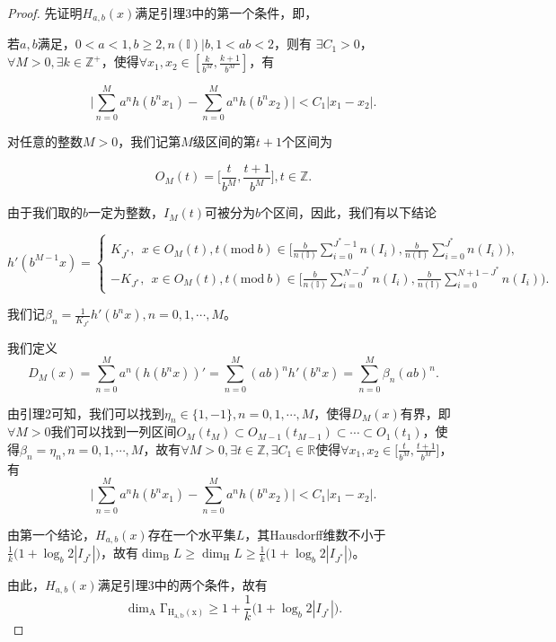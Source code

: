\begin{proof}

    先证明$H_{a,b}(x)$满足引理3中的第一个条件，即，

    若$a,b$满足，$0<a<1,b\ge2,n(\mathbb{I})|b,1<ab<2$，则有 $\exists C_1>0$，
    $\forall M>0,\exists k\in\mathbb{Z}^+$，使得$\forall x_1,x_2\in [\frac{k}{b^M},\frac{k+1}{b^M}]$，有

    $$
    \Big|\sum_{n=0}^Ma^nh(b^nx_1)-\sum_{n=0}^Ma^nh(b^nx_2)\Big|<C_1|x_1-x_2|.
    $$

    对任意的整数$M>0$，我们记第$M$级区间的第$t+1$个区间为

    $$
    O_M(t)=\big[\frac{t}{b^M},\frac{t+1}{b^M}\big],t\in\mathbb{Z}.
    $$

    由于我们取的$b$一定为整数，$I_M(t)$可被分为$b$个区间，因此，我们有以下结论

    $$
    h'(b^{M-1}x)=\begin{cases}
        K_{J^*},~~x\in O_M(t),t(\mathrm{mod}~b) \in {\big[}\frac{b}{n(\mathbb{I})}\sum_{i=0}^{J^*-1}n(I_i),\frac{b}{n(\mathbb{I})}\sum_{i=0}^{J^*}n(I_i){\big)},\\
        -K_{J^*},~~x\in O_M(t),t(\mathrm{mod}~b) \in {\big[}\frac{b}{n(\mathbb{I})}\sum_{i=0}^{N-J^*}n(I_i),\frac{b}{n(\mathbb{I})}\sum_{i=0}^{N+1-J^*}n(I_i){\big)}.
    \end{cases}
    $$

    我们记$\beta_n=\frac{1}{K_{J^*}}h'(b^nx),n=0,1,\cdots,M$。

      我们定义
      $$
      D_M(x)=\sum_{n=0}^Ma^n(h(b^nx))'=\sum_{n=0}^M(ab)^nh'(b^nx)=\sum_{n=0}^M\beta_n(ab)^n.
      $$

      由引理2可知，我们可以找到$\eta_n\in\{1,-1\},n=0,1,\cdots,M$，使得$D_M(x)$有界，即$\forall M>0$我们可以找到一列区间$O_M(t_M)\subset O_{M-1}(t_{M-1})\subset\cdots\subset O_1(t_1)$，使得$\beta_n=\eta_n,n=0,1,\cdots,M$，故有$\forall M>0,\exists t\in\mathbb{Z},\exists C_1\in\mathbb{R}$使得$\forall x_1,x_2\in \big[\frac{t}{b^M},\frac{t+1}{b^M}\big]$，有
    $$
    \Big|\sum_{n=0}^Ma^nh(b^nx_1)-\sum_{n=0}^Ma^nh(b^nx_2)\Big|<C_1|x_1-x_2|.
    $$

    由第一个结论，$H_{a,b}(x)$存在一个水平集$L$，其Hausdorff维数不小于$\frac{1}{k}\Big(1+\log_b 2|I_{J^*}|\Big)$，故有$\mathrm{\dim_B}L\ge\mathrm{\dim_H}L\ge\frac{1}{k}\Big(1+\log_b2|I_{J^*}|\Big)$。

    由此，$H_{a,b}(x)$满足引理3中的两个条件，故有
    $$
        \mathrm{\dim_A\Gamma_{H_{a,b}(x)}}\ge1+\frac{1}{k}\big(1+\log_b2|I_{J^*}|\big).
    $$
\end{proof}

